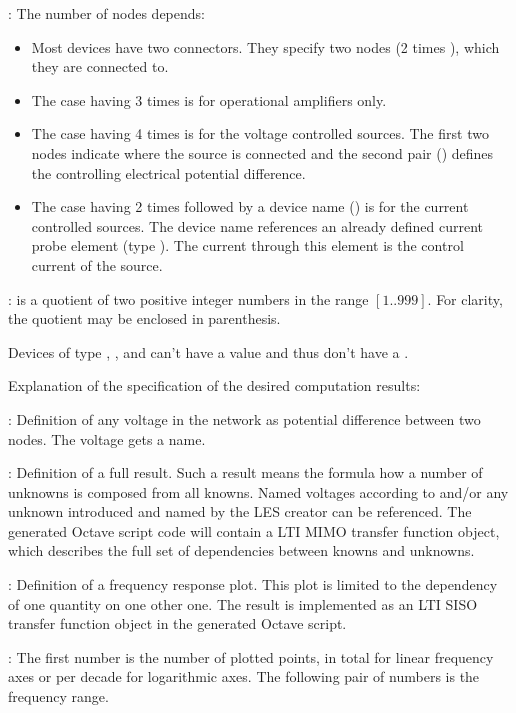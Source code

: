 : The number of nodes depends:
\begin{itemize}
  \item Most devices have two connectors. They specify two nodes (2 times
    ), which they are connected to.
  \item The case having 3 times  is for operational
    amplifiers only.
  \item The case having 4 times  is for the voltage
    controlled sources. The first two nodes indicate where the source is
    connected and the second pair () defines the
    controlling electrical potential difference.
  \item The case having 2 times  followed by a device name
    () is for the current controlled sources. The device
    name references an already defined current probe element (type
    ). The current through this element is the control current of
    the source.
\end{itemize}

:  is a quotient of two positive
integer numbers in the range $[1..999]$. For clarity, the quotient may be
enclosed in parenthesis.

Devices of type , ,  and  can't have a
value and thus don't have a .


Explanation of the specification of the desired computation results:

: Definition of any voltage in the network as potential
difference between two nodes. The voltage gets a name.

: Definition of a full result. Such a result means the
formula how a number of unknowns is composed from all knowns. Named
voltages according to  and/or any unknown introduced
and named by the LES creator can be referenced. The generated Octave
script code will contain a LTI MIMO transfer function object, which
describes the full set of dependencies between knowns and unknowns.

: Definition of a frequency response plot. This plot
is limited to the dependency of one quantity on one other one. The result
is implemented as an LTI SISO transfer function object in the generated
Octave script.

: The first number is the number of plotted points, in
total for linear frequency axes or per decade for logarithmic axes. The
following pair of numbers is the frequency range.


